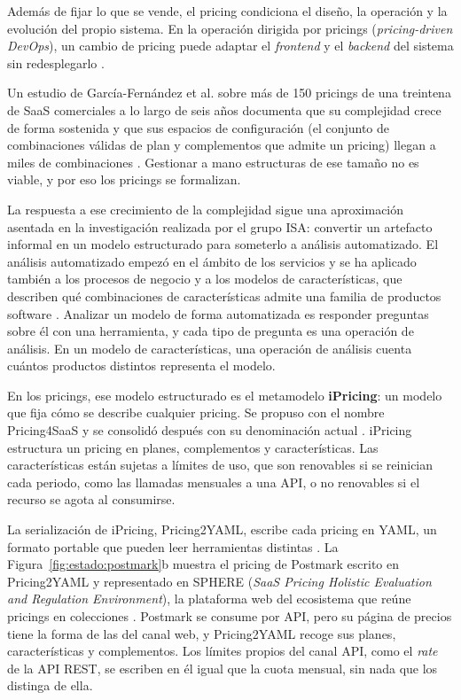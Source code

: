 Además de fijar lo que se vende, el pricing condiciona el diseño, la
operación y la evolución del propio sistema. En la operación dirigida por
pricings (\textit{pricing-driven DevOps}), un cambio de pricing puede
adaptar el \textit{frontend} y el \textit{backend} del sistema sin
redesplegarlo \citep{garciafernandez2025trends}.

Un estudio de García-Fernández et al. sobre más de 150 pricings de una
treintena de SaaS comerciales a lo largo de seis años documenta que su
complejidad crece de forma sostenida y que sus espacios de configuración
(el conjunto de combinaciones válidas de plan y complementos que admite un
pricing) llegan a miles de combinaciones
\citep{garciafernandez2024racing}. Gestionar a mano estructuras de ese
tamaño no es viable, y por eso los pricings se formalizan.

La respuesta a ese crecimiento de la complejidad sigue una aproximación
asentada en la investigación realizada por el grupo ISA: convertir un
artefacto informal en un modelo estructurado para someterlo a análisis
automatizado. El análisis automatizado empezó en el ámbito de los servicios
\citep{ruizcortes2005procurement} y se ha aplicado también a los procesos de
negocio \citep{delrio2013ppinot}
y a los modelos de características, que describen qué combinaciones de
características admite una familia de productos software
\citep{benavides2010fm}. Analizar un modelo de forma automatizada es
responder preguntas sobre él con una herramienta, y cada tipo de pregunta
es una operación de análisis. En un modelo de características, una
operación de análisis cuenta cuántos productos distintos representa el
modelo.

En los pricings, ese modelo estructurado es el metamodelo
\textbf{iPricing}: un modelo que fija cómo se describe cualquier pricing.
Se propuso con el nombre Pricing4SaaS \citep{garciafernandez2024pricing4saas}
y se consolidó después con su denominación actual
\citep{garciafernandez2025ipricing}. iPricing
estructura un pricing en planes, complementos y características. Las
características están sujetas a límites de uso, que son renovables si se
reinician cada periodo, como las llamadas mensuales a una API, o no
renovables si el recurso se agota al consumirse.

La serialización de iPricing, Pricing2YAML, escribe cada pricing en YAML,
un formato portable que pueden leer herramientas distintas
\citep{garciafernandez2025trends}. La Figura~\ref{fig:estado:postmark}b
muestra el pricing de Postmark escrito en Pricing2YAML y representado en
SPHERE (\textit{SaaS Pricing Holistic Evaluation and Regulation
Environment}), la plataforma web del ecosistema que reúne pricings en
colecciones \citep{sphere,gavira2026tfm}. Postmark se consume por API,
pero su página de precios tiene la forma de las del canal web, y
Pricing2YAML recoge sus planes, características y complementos. Los
límites propios del canal API, como el \textit{rate} de la API REST, se
escriben en él igual que la cuota mensual, sin nada que los distinga de
ella.

